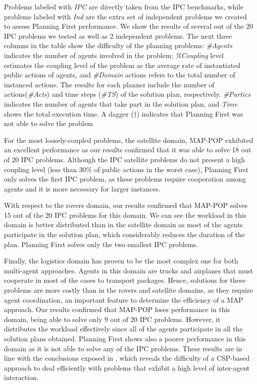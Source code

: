 \documentclass[12pt]{article}
\begin{document}
Problems labeled with \textit{IPC} are directly taken from the IPC benchmarks,
while problems labeled with \textit{Ind} are the extra set of independent problems
we created to assess Planning First performance.
We show the results of several out of the 20 IPC problems we tested as well as 2 independent problems.
The next three columns in the table show the difficulty of the planning problems:
\textit{\#Agents} indicates the number of agents involved in the problem;
\textit{\%Coupling} level estimates the coupling level of the problem as
the average rate of instantiated public actions of agents,
and \textit{\#Domain} actions refers to the total number of instanced actions.
The results for each planner include the number of actions(\textit{\#Acts})
and time steps (\textit{\#TS}) of the solution plan, respectively.
\textit{\#Partics} indicates the number of agents that take part in the solution plan,
and \textit{Time} shows the total execution time.
A dagger ($\dagger$) indicates that Planning First was not able to solve the problem

For the most loosely-coupled problems, the satellite domain,
MAP-POP exhibited an excellent performance as our results confirmed that it was able to
solve 18 out of 20 IPC problems.
Although the IPC satellite problems do not present a high coupling level
(less than 30\% of public actions in the worst case),
Planning First only solves the first IPC problem,
as these problems require cooperation among agents and it is more necessary for larger instances.

With respect to the rovers domain, our results confirmed that
MAP-POP solves 15 out of the 20 IPC problems for this domain.
We can see the workload in this domain is better distributed than in the satellite domain
as most of the agents participate in the solution plan,
which considerably reduces the duration of the plan.
Planning First solves only the two smallest IPC problems.

Finally, the logistics domain has proven to be the most complex one for both multi-agent approaches.
Agents in this domain are trucks and airplanes
that must cooperate in most of the cases to transport packages.
Hence, solutions for these problems are more costly than in the rovers and satellite domains,
as they require agent coordination, an important feature to determine the efficiency of a MAP approach.
Our results confirmed that MAP-POP loses performance in this domain,
being able to solve only 9 out of 20 IPC problems.
However, it distributes the workload effectively
since all of the agents participate in all the solution plans obtained.
Planning First shows also a poorer performance in this domain
as it is not able to solve any of the IPC problems.
These results are in line with the conclusions exposed in \cite{7d175e0276cb49c2bb75a5844ae4b1b2},
which reveals the difficulty of a CSP-based approach
to deal efficiently with problems that exhibit a high level of inter-agent interaction.
\end{document}
